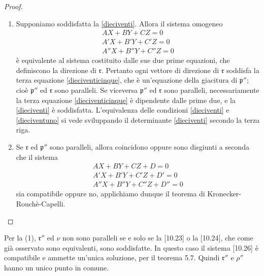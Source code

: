 \documentclass{article}
\theoremstyle{plain}
\theoremstyle{definition}
\theoremstyle{remark}
\begin{document}
\begin{proof}
\begin{enumerate}
    \item Supponiamo soddisfatta la \ref{dieciventi}. Allora il sistema omogeneo
        \begin{equation}\label{dieciventicinque}
        \begin{matrix}
        AX + BY + CZ = 0  \\
        A'X + B'Y + C'Z = 0  \\
        A''X + B''Y + C''Z = 0  
        \end{matrix}
        \end{equation}
        è equivalente al sistema costituito dalle sue due prime equazioni, che definiscono la direzione di $\mathfrak{r}$. 
        Pertanto ogni vettore di direzione di $\mathfrak{r}$ soddisfa la terza equazione \ref{dieciventicinque}, che è un'equazione 
        della giacitura di $\mathfrak{p}''$; cioè $\mathfrak{p}''$ ed $\mathfrak{r}$ sono paralleli. Se viceversa 
        $\mathfrak{p}''$ ed $\mathfrak{r}$ sono paralleli, necessariamente la terza equazione \ref{dieciventicinque} è 
        dipendente dalle prime due, e la \ref{dieciventi} è soddisfatta. L'equivalenza delle condizioni \ref{dieciventi} e \ref{dieciventuno} 
        si vede sviluppando il determinante \ref{dieciventi} secondo la terza riga.
    \item Se $\mathfrak{r}$ ed $\mathfrak{p}''$ sono paralleli, allora coincidono oppure sono disgiunti a seconda 
        che il sistema
        \begin{equation}\label{dieciventisei}
        \begin{matrix}
        AX + BY + CZ + D = 0 \\
        A'X + B'Y + C'Z + D' = 0 \\
        A''X + B''Y + C''Z + D'' = 0
        \end{matrix}
        \end{equation}
        sia compatibile oppure no, applichiamo dunque il teorema di Kronecker-Rouchè-Capelli.
    \end{enumerate}
\end{proof}
 
Per la (1), $\mathfrak{r}''$ ed $\nu$ non sono paralleli se e solo se la [10.23] o la [10.24], che come già osservato sono equivalenti, sono soddisfatte. In questo caso il sistema [10.26] è compatibile e ammette un'unica soluzione, per il teorema 5.7. Quindi $\mathfrak{r}''$ e $\rho''$ hanno un unico punto in comune.
\end{document}
